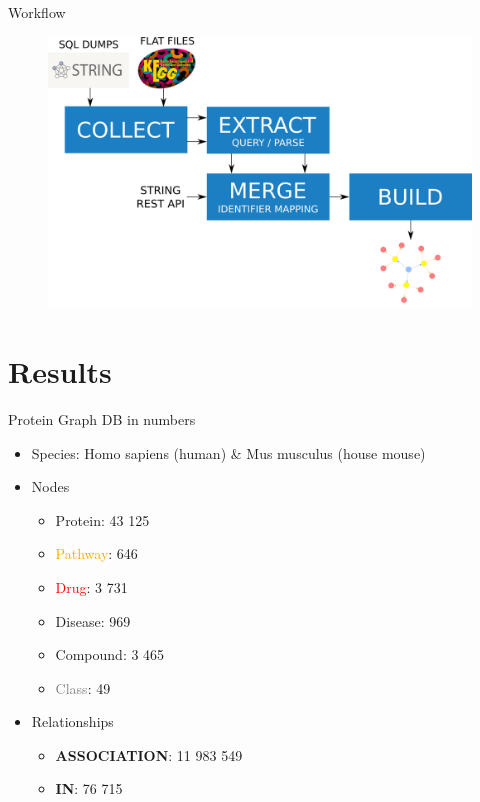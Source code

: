 \documentclass{beamer}
\begin{document}
\begin{frame}{Workflow}
\begin{figure}
    \centering
    \includegraphics[width=0.9\linewidth]{workflow2.png}
\end{figure}
\end{frame}

\section{Results}


\begin{frame}{Protein Graph DB in numbers}
\begin{itemize}
    \item Species: Homo sapiens (human) \& Mus musculus (house mouse)
    \vfill
    \item Nodes
    \begin{itemize}
        \item \textcolor{protein}{Protein}: 43 125
        \item \textcolor{orange}{Pathway}: 646
        \item \textcolor{red}{Drug}: 3 731
        \item \textcolor{disease}{Disease}: 969
        \item \textcolor{compound}{Compound}: 3 465
        \item \textcolor{gray}{Class}: 49
    \end{itemize}
    \vfill
    \item Relationships
    \begin{itemize}
        \item \textbf{ASSOCIATION}: 11 983 549
        \item \textbf{IN}: 76 715
    \end{itemize}
\end{itemize}
\end{frame}
\end{document}
